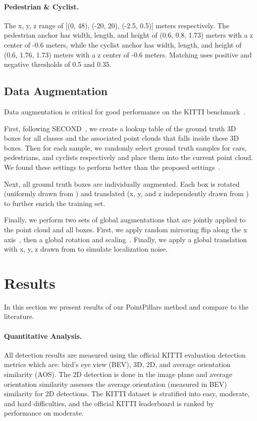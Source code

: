 \documentclass[10pt,twocolumn,letterpaper]{article}
\newcommand{\mypar}[1]{\vspace{-4mm}\paragraph{#1}}
\newcommand{\squeeze}{\vspace{-0.5mm}}
\begin{document}
\mypar{Pedestrian \& Cyclist.}
The x, y, z range of [(0, 48), (-20, 20), (-2.5, 0.5)] meters respectively.
The pedestrian anchor has width, length, and height of (0.6, 0.8, 1.73) meters with a z center of -0.6 meters, while the cyclist anchor has width, length, and height of (0.6, 1.76, 1.73) meters with a z center of -0.6 meters.
Matching uses positive and negative thresholds of 0.5 and 0.35.

\squeeze
\subsection{Data Augmentation}
\squeeze
Data augmentation is critical for good performance on the KITTI benchmark~\cite{second, pixor, mv3d}.

First, following SECOND~\cite{second}, we create a lookup table of the ground truth 3D boxes for all classes and the associated point clouds that falls inside these 3D boxes.
Then for each sample, we randomly select  ground truth samples for cars, pedestrians, and cyclists respectively and place them into the current point cloud.
We found these settings to perform better than the proposed settings~\cite{second}.

Next, all ground truth boxes are individually augmented.
Each box is rotated (uniformly drawn from ) and translated (x, y, and z independently drawn from ) to further enrich the training set.

Finally, we perform two sets of global augmentations that are jointly applied to the point cloud and all boxes.
First, we apply random mirroring flip along the x axis~\cite{pixor}, then a global rotation and scaling~\cite{voxelnet, second}.
Finally, we apply a global translation with x, y, z drawn from  to simulate localization noise.

\section{Results} \label{sec:results}
\squeeze

In this section we present results of our PointPillars method and compare to the literature.

\squeeze
\mypar{Quantitative Analysis.}
All detection results are measured using the official KITTI evaluation detection metrics which are: bird's eye view (BEV), 3D, 2D, and average orientation similarity (AOS).
The 2D detection is done in the image plane and average orientation similarity assesses the average orientation (measured in BEV) similarity for 2D detections.
The KITTI dataset is stratified into easy, moderate, and hard difficulties, and the official KITTI leaderboard is ranked by performance on moderate.
\end{document}
